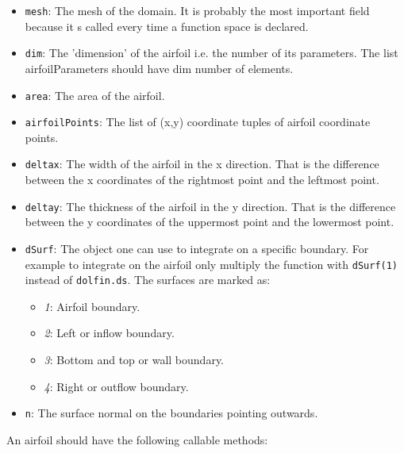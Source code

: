 \documentclass[12pt, a4paper]{article}
\begin{document}
            \begin{itemize}
                \item \texttt{mesh}: The mesh of the domain. It is probably the most important field because it s called every time a function space is declared.
                \item \texttt{dim}: The 'dimension' of the airfoil i.e. the number of its parameters. The list airfoilParameters should have dim number of elements.
                \item \texttt{area}: The area of the airfoil.
                \item \texttt{airfoilPoints}: The list of (x,y) coordinate tuples of airfoil coordinate points.
                \item \texttt{deltax}: The width of the airfoil in the x direction. That is the difference between the x coordinates of the rightmost point and the leftmost point.
                \item \texttt{deltay}: The thickness of the airfoil in the y direction. That is the difference between the y coordinates of the uppermost point and the lowermost point.
                \item \texttt{dSurf}: The object one can use to integrate on a specific boundary. For example to integrate on the airfoil only multiply the function with \texttt{dSurf(1)} instead of \texttt{dolfin.ds}. The surfaces are marked as:
                \begin{itemize}
                    \item \textit{1}: Airfoil boundary.
                    \item \textit{2}: Left or inflow boundary.
                    \item \textit{3}: Bottom and top or wall boundary.
                    \item \textit{4}: Right or outflow boundary.
                \end{itemize}
                \item \texttt{n}: The surface normal on the boundaries pointing outwards.
            \end{itemize}
            An airfoil should have the following callable methods:
\end{document}
